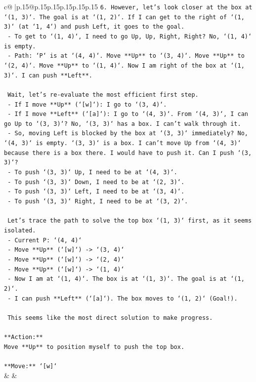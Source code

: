 \documentclass{article}
\begin{document}
{\begin{supertabular}{c@{$\;$}|p{.15\linewidth}@{}p{.15\linewidth}p{.15\linewidth}p{.15\linewidth}p{.15\linewidth}p{.15\linewidth}}
{{{\texttt{6.  However, let's look closer at the box at `(1, 3)`. The goal is at `(1, 2)`. If I can get to the right of `(1, 3)` (at `1, 4`) and push Left, it goes to the goal.} \\
\texttt{    {-} To get to `(1, 4)`, I need to go Up, Up, Right, Right? No, `(1, 4)` is empty.} \\
\texttt{    {-} Path: `P` is at `(4, 4)`. Move **Up** to `(3, 4)`. Move **Up** to `(2, 4)`. Move **Up** to `(1, 4)`. Now I am right of the box at `(1, 3)`. I can push **Left**.} \\
\\ 
\texttt{    Wait, let's re{-}evaluate the most efficient first step.} \\
\texttt{    {-} If I move **Up** (`{[}w{]}`): I go to `(3, 4)`.} \\
\texttt{    {-} If I move **Left** (`{[}a{]}`): I go to `(4, 3)`. From `(4, 3)`, I can go Up to `(3, 3)`? No, `(3, 3)` has a box. I can't walk through it.} \\
\texttt{    {-} So, moving Left is blocked by the box at `(3, 3)` immediately? No, `(4, 3)` is empty. `(3, 3)` is a box. I can't move Up from `(4, 3)` because there is a box there. I would have to push it. Can I push `(3, 3)`?} \\
\texttt{        {-} To push `(3, 3)` Up, I need to be at `(4, 3)`.} \\
\texttt{        {-} To push `(3, 3)` Down, I need to be at `(2, 3)`.} \\
\texttt{        {-} To push `(3, 3)` Left, I need to be at `(3, 4)`.} \\
\texttt{        {-} To push `(3, 3)` Right, I need to be at `(3, 2)`.} \\
\\ 
\texttt{    Let's trace the path to solve the top box `(1, 3)` first, as it seems isolated.} \\
\texttt{    {-} Current P: `(4, 4)`} \\
\texttt{    {-} Move **Up** (`{[}w{]}`) {-}> `(3, 4)`} \\
\texttt{    {-} Move **Up** (`{[}w{]}`) {-}> `(2, 4)`} \\
\texttt{    {-} Move **Up** (`{[}w{]}`) {-}> `(1, 4)`} \\
\texttt{    {-} Now I am at `(1, 4)`. The box is at `(1, 3)`. The goal is at `(1, 2)`.} \\
\texttt{    {-} I can push **Left** (`{[}a{]}`). The box moves to `(1, 2)` (Goal!).} \\
\\ 
\texttt{    This seems like the most direct solution to make progress.} \\
\\ 
\texttt{**Action:**} \\
\texttt{Move **Up** to position myself to push the top box.} \\
\\ 
\texttt{**Move:** `{[}w{]}`} \\
            }
        }
    }
    & & \\ \\


\end{supertabular}}
\end{document}
